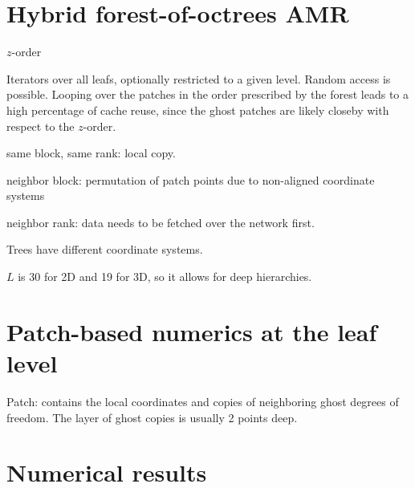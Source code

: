 \documentclass{IOS-Book-Article}     %
\begin{document}
\section*{Hybrid forest-of-octrees AMR}


$z$-order

Iterators over all leafs, optionally restricted to a given level.
Random access is possible.  Looping over the patches in the order prescribed
by the forest leads to a high percentage of cache reuse, since the ghost
patches are likely closeby with respect to the $z$-order.


same block, same rank: local copy.

neighbor block: permutation of patch points due to non-aligned
coordinate systems

neighbor rank: data needs to be fetched over the network first.

Trees have different coordinate systems.

$L$ is 30 for 2D and 19 for 3D, so it allows for deep hierarchies.



\section*{Patch-based numerics at the leaf level}


Patch: contains the local coordinates and copies of neighboring ghost degrees
of freedom.  The layer of ghost copies is usually 2 points deep.


\section*{Numerical results}






\end{document}
